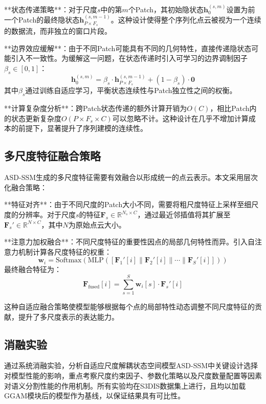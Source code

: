 \documentclass[12pt,a4paper,openany,oneside]{ctexbook}
\theoremstyle{definition}
\theoremstyle{remark}
\begin{document}
**状态传递策略**：对于尺度$s$中的第$m$个Patch，其初始隐状态$\mathbf{h}_0^{(s,m)}$设置为前一个Patch的最终隐状态$\mathbf{h}_{P \times F_s}^{(s,m-1)}$。这种设计使得整个序列化点云被视为一个连续的数据流，而非独立的窗口片段。

**边界效应缓解**：由于不同Patch可能具有不同的几何特性，直接传递隐状态可能引入不一致性。为缓解这一问题，在状态传递时引入可学习的边界调制因子$\beta_s \in [0,1]$：
\begin{equation}
\mathbf{h}_0^{(s,m)} = \beta_s \cdot \mathbf{h}_{P \times F_s}^{(s,m-1)} + (1-\beta_s) \cdot \mathbf{0}
\end{equation}
其中$\beta_s$通过训练自适应学习，平衡状态连续性与Patch独立性之间的权衡。

**计算复杂度分析**：跨Patch状态传递的额外计算开销为$O(C)$，相比Patch内的状态更新复杂度$O(P \times F_s \times C)$可以忽略不计。这种设计在几乎不增加计算成本的前提下，显著提升了序列建模的连续性。

\subsection{多尺度特征融合策略}

ASD-SSM生成的多尺度特征需要有效融合以形成统一的点云表示。本文采用层次化融合策略：

**特征对齐**：由于不同尺度的Patch大小不同，需要将粗尺度特征上采样至细尺度的分辨率。对于尺度$s$的特征$\mathbf{F}_s \in \mathbb{R}^{N_s \times C}$，通过最近邻插值将其扩展至$\mathbf{F}_s' \in \mathbb{R}^{N \times C}$，其中$N$为原始点云大小。

**注意力加权融合**：不同尺度特征的重要性因点的局部几何特性而异。引入自注意力机制计算各尺度特征的权重：
\begin{equation}
\mathbf{w}_i = \text{Softmax}(\text{MLP}([\mathbf{F}_1'[i] \| \mathbf{F}_2'[i] \| \cdots \| \mathbf{F}_S'[i]]))
\end{equation}
最终融合特征为：
\begin{equation}
\mathbf{F}_{\text{fused}}[i] = \sum_{s=1}^{S} \mathbf{w}_i[s] \cdot \mathbf{F}_s'[i]
\end{equation}

这种自适应融合策略使模型能够根据每个点的局部特性动态调整不同尺度特征的贡献，提升了多尺度表示的表达能力。

\subsection{消融实验}

通过系统消融实验，分析自适应尺度解耦状态空间模型ASD-SSM中关键设计选择对模型性能的影响，重点考察尺度约束因子、参数化策略以及尺度数量配置等因素对语义分割性能的作用机制。所有实验均在S3DIS数据集上进行，且均以加载GGAM模块后的模型作为基线，以保证结果具有可比性。
\end{document}
